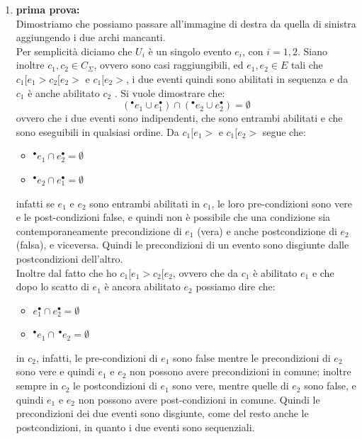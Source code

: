 \documentclass[a4paper,12pt, oneside]{book}
\begin{document}
\begin{enumerate}
  \item \textbf{prima prova:}\\
  Dimostriamo che possiamo passare all'immagine di destra da quella di sinistra
  aggiungendo i due archi mancanti.\\
  Per semplicità diciamo che $U_i$ è un singolo evento $e_i$, con $i=1,2$. Siano
  inoltre $c_1,c_2\in C_\Sigma$, ovvero sono casi raggiungibili, ed $e_1,e_2\in
  E$ tali che $c_1 [e_1 > c_2 [e_2 > \mbox{ e } c_1 [e_2 >$, i due eventi quindi
  sono abilitati in sequenza e da $c_1$ è anche abilitato $c_2$ . Si vuole
  dimostrare che: 
  \[(^\bullet e_1\cup e_1^\bullet)\cap(^\bullet e_2\cup e_2^\bullet)=\emptyset\]
  ovvero che i due eventi sono indipendenti, che sono entrambi abilitati e che
  sono eseguibili in qualsiasi ordine.
  \newpage
  Da $c_1 [e_1 > \mbox{ e }c_1 [e_2 >$ segue che:
  \begin{itemize}
    \item $^\bullet e_1\cap e_2^\bullet=\emptyset$
    \item $^\bullet e_2\cap e_1^\bullet=\emptyset$
  \end{itemize}
  infatti se $e_1$ e $e_2$ sono entrambi abilitati in $c_1$, le loro
  pre-condizioni sono vere e le post-condizioni false, e quindi non è possibile
  che una condizione sia contemporaneamente precondizione di $e_1$ (vera) e
  anche postcondizione di $e_2$ (falsa), e viceversa. Quindi le precondizioni
  di un evento sono disgiunte dalle postcondizioni dell'altro.\\
  Inoltre dal fatto che ho $c_1 [e_1 > c_2 [e_2$, ovvero che da $c_1$ è
  abilitato $e_1$ e che dopo lo scatto di $e_1$ è ancora abilitato $e_2$
  possiamo dire che:
  \begin{itemize}
    \item $e_1^\bullet\cap e_2^\bullet=\emptyset$
    \item $^\bullet e_1\cap\, ^\bullet e_2=\emptyset$
  \end{itemize}
  in $c_2$, infatti, le pre-condizioni di $e_1$ sono false mentre le
  precondizioni di $e_2$ sono vere e quindi $e_1$ e $e_2$ non possono avere
  precondizioni in comune; inoltre sempre in $c_2$ le postcondizioni di $e_1$
  sono vere, mentre quelle di $e_2$ sono false, e quindi $e_1$ e $e_2$ non
  possono avere post-condizioni in comune. Quindi le precondizioni dei due
  eventi sono disgiunte, come del resto anche le postcondizioni, in quanto i due
  eventi sono sequenziali.\\

\end{enumerate}
\end{document}
